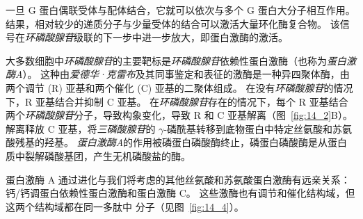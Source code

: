 一旦 G 蛋白偶联受体与配体结合，它就可以依次与多个 G 蛋白大分子相互作用。
结果，相对较少的递质分子与少量受体的结合可以激活大量环化酶复合物。
该信号在\textit{环磷酸腺苷}级联的下一步中进一步放大，即蛋白激酶的激活。


大多数细胞中\textit{环磷酸腺苷}的主要靶标是\textit{环磷酸腺苷}依赖性蛋白激酶（也称为\textit{蛋白激酶A}）。
这种由\textit{爱德华·克雷布}及其同事鉴定和表征的激酶是一种异四聚体酶，由两个调节 (R) 亚基和两个催化 (C) 亚基的二聚体组成。
在没有\textit{环磷酸腺苷}的情况下，R 亚基结合并抑制 C 亚基。
在\textit{环磷酸腺苷}存在的情况下，每个 R 亚基结合两个\textit{环磷酸腺苷}分子，导致构象变化，导致 R 和 C 亚基解离（图~\ref{fig:14_2}B）。
解离释放 C 亚基，将\textit{三磷酸腺苷}的 $\gamma$-磷酰基转移到底物蛋白中特定丝氨酸和苏氨酸残基的羟基。
\textit{蛋白激酶A}的作用被磷蛋白磷酸酶终止，磷蛋白磷酸酶是从蛋白质中裂解磷酸基团，产生无机磷酸盐的酶。


蛋白激酶 A 通过进化与我们将考虑的其他丝氨酸和苏氨酸蛋白激酶有远亲关系：钙/钙调蛋白依赖性蛋白激酶和蛋白激酶 C。
这些激酶也有调节和催化结构域，但这两个结构域都在同一多肽中 分子（见图~\ref{fig:14_4}）。


